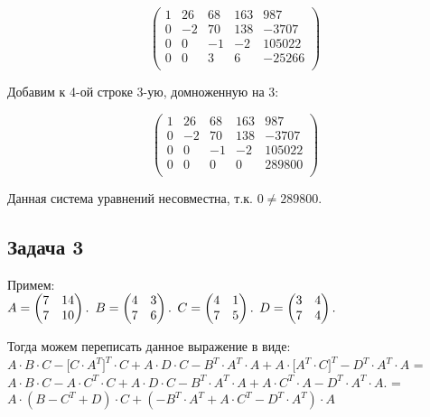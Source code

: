 	\[
	\begin{pmatrix}
	1 & 26 & 68 & 163 & 987 \\
	0 & -2 & 70 & 138 & -3707 \\
	0 & 0 & -1 & -2 & 105022 \\
	0 & 0 & 3 & 6 & -25266 \\
	\end{pmatrix}
	\]
	
	Добавим к 4-ой строке 3-ую, домноженную на 3:
	
	\[
	\begin{pmatrix}
	1 & 26 & 68 & 163 & 987 \\
	0 & -2 & 70 & 138 & -3707 \\
	0 & 0 & -1 & -2 & 105022 \\
	0 & 0 & 0 & 0 & 289800 \\
	\end{pmatrix}
	\]
	
	Данная система уравнений несовместна, т.к. $0 \not= 289800$.
	
	\subsection{Задача 3} 
	
	Примем: \\
	$A = \begin{pmatrix} 7 & 14 \\ 7 & 10 \\ \end{pmatrix}.\\$
	$B = \begin{pmatrix} 4 & 3 \\ 7 & 6 \\ \end{pmatrix}.\\$
	$C = \begin{pmatrix} 4 & 1 \\ 7 & 5 \\ \end{pmatrix}.\\$
	$D = \begin{pmatrix} 3 & 4 \\ 7 & 4 \\ \end{pmatrix}.\\$
	
	Тогда можем переписать данное выражение в виде: \\
	$A \cdot B \cdot C - \biggl[ C \cdot A^T \biggr]^T \cdot C + A \cdot D \cdot C - B^T \cdot A^T \cdot A + A \cdot \biggl[ A^T \cdot C \biggr]^T - D^T \cdot A^T \cdot A$ = 
	$A \cdot B \cdot C - A \cdot C^T \cdot C + A \cdot D \cdot C - B^T \cdot A^T \cdot A + A \cdot C^T \cdot A - D^T \cdot A^T \cdot A.$ = 
	$A \cdot (B  - C^T  + D) \cdot C + (-B^T \cdot A^T + A \cdot C^T - D^T \cdot A^T) \cdot A$
	
